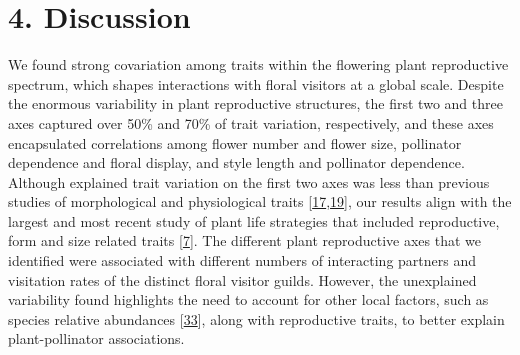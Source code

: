 \documentclass[
  12pt,
  a4paper,
]{article}
\begin{document}
\hypertarget{discussion}{%
\section{4. Discussion}\label{discussion}}

We found strong covariation among traits within the flowering plant reproductive spectrum, which shapes interactions with floral visitors at a global scale. Despite the enormous variability in plant reproductive structures, the first two and three axes captured over 50\% and 70\% of trait variation, respectively, and these axes encapsulated correlations among flower number and flower size, pollinator dependence and floral display, and style length and pollinator dependence. Although explained trait variation on the first two axes was less than previous studies of morphological and physiological traits {[}\protect\hyperlink{ref-diaz2016}{17},\protect\hyperlink{ref-carmona2021}{19}{]}, our results align with the largest and most recent study of plant life strategies that included reproductive, form and size related traits {[}\protect\hyperlink{ref-salguero2016}{7}{]}. The different plant reproductive axes that we identified were associated with different numbers of interacting partners and visitation rates of the distinct floral visitor guilds. However, the unexplained variability found highlights the need to account for other local factors, such as species relative abundances {[}\protect\hyperlink{ref-bartomeus2016}{33}{]}, along with reproductive traits, to better explain plant-pollinator associations.
\end{document}
